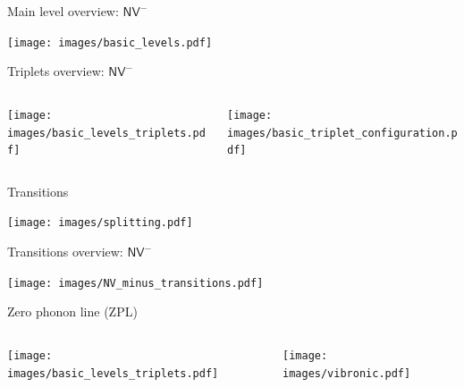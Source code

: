 \documentclass[]{beamer}
\begin{document}
\begin{frame}{Main level overview: $ \mathsf{NV}^{-} $ }
  \begin{center}
    \texttt{[image: images/basic\_levels.pdf]}
  \end{center}
\end{frame}

\begin{frame}{Triplets overview: $ \mathsf{NV}^{-} $ }
  \begin{center}
    \begin{columns}
      \begin{column}{0.5\textwidth}
        \centering
        \texttt{[image: images/basic\_levels\_triplets.pdf]}
      \end{column}
      \begin{column}{0.5\textwidth}
        \centering
        \texttt{[image: images/basic\_triplet\_configuration.pdf]}
      \end{column}
    \end{columns}
  \end{center}
\end{frame}

\begin{frame}{Transitions}
  \begin{center}
    \texttt{[image: images/splitting.pdf]}
  \end{center}
\end{frame}

\begin{frame}{Transitions overview: $ \mathsf{NV}^{-} $ }
  \begin{center}
    \texttt{[image: images/NV\_minus\_transitions.pdf]}
  \end{center}
\end{frame}


\begin{frame}{Zero phonon line (ZPL)}
  \begin{columns}
    \begin{column}{0.5\textwidth}
      \texttt{[image: images/basic\_levels\_triplets.pdf]}
    \end{column}
    \begin{column}{0.5\textwidth}
      \texttt{[image: images/vibronic.pdf]}
    \end{column}
  \end{columns}
\end{frame}
\end{document}

